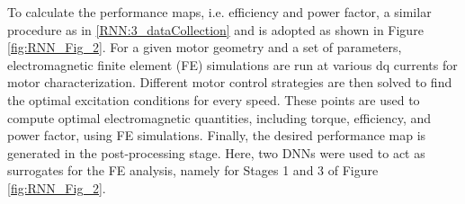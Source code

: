 To calculate the performance maps, i.e. efficiency and power factor, a similar procedure as in \ref{RNN:3_dataCollection} and \parencite{mohammadi2017computational, khan2020efficiency} is adopted as shown in Figure \ref{fig:RNN_Fig_2}. For a given motor geometry and a set of parameters, electromagnetic finite element (FE) simulations \parencite{mentor_motorsolve} are run at various dq currents for motor characterization. Different motor control strategies are then solved to find the optimal excitation conditions for every speed. These points are used to compute optimal electromagnetic quantities, including torque, efficiency, and power factor, using FE simulations. Finally, the desired performance map is generated in the post-processing stage. Here, two DNNs were used to act as surrogates for the FE analysis, namely for Stages 1 and 3 of Figure \ref{fig:RNN_Fig_2}.
\\

